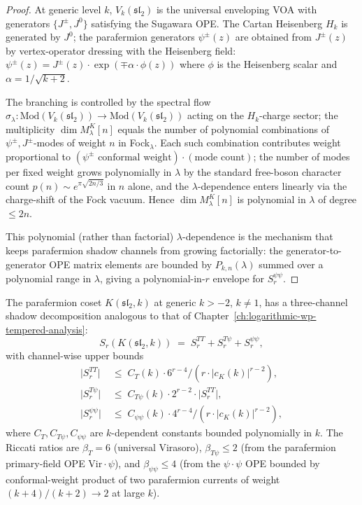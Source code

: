 \begin{proof}
At generic level $k$, $V_k(\mathfrak{sl}_2)$ is the universal
enveloping VOA with generators $\{J^\pm, J^0\}$ satisfying the
Sugawara OPE. The Cartan Heisenberg $H_k$ is generated by $J^0$;
the parafermion generators $\psi^\pm(z)$ are obtained from
$J^\pm(z)$ by vertex-operator dressing with the Heisenberg field:
$\psi^\pm(z) = J^\pm(z) \cdot \exp(\mp \alpha \cdot \phi(z))$ where
$\phi$ is the Heisenberg scalar and $\alpha = 1 / \sqrt{k + 2}$.

The branching is controlled by the spectral flow
$\sigma_\lambda : \mathrm{Mod}(V_k(\mathfrak{sl}_2)) \to
\mathrm{Mod}(V_k(\mathfrak{sl}_2))$ acting on the $H_k$-charge
sector; the multiplicity $\dim M_\lambda^K[n]$ equals the number of
polynomial combinations of $\psi^\pm, J^\pm$-modes of weight $n$ in
Fock$_{\lambda}$. Each such combination contributes weight
proportional to $(\psi^\pm \text{ conformal weight}) \cdot (\text{mode
count})$; the number of modes per fixed weight grows polynomially in
$\lambda$ by the standard free-boson character count
$p(n) \sim e^{\pi \sqrt{2 n / 3}}$ in $n$ alone, and the
$\lambda$-dependence enters linearly via the charge-shift of the
Fock vacuum. Hence $\dim M_\lambda^K[n]$ is polynomial in $\lambda$
of degree $\le 2 n$.

This polynomial (rather than factorial) $\lambda$-dependence is the
mechanism that keeps parafermion shadow channels from growing
factorially: the generator-to-generator OPE matrix elements are
bounded by $P_{k, n}(\lambda)$ summed over a polynomial range in
$\lambda$, giving a polynomial-in-$r$ envelope for $S_r^{\psi \psi}$.
\end{proof}

\begin{proposition}
\label{prop:parafermion-channel-decomposition}
\ClaimStatusProvedHere
The parafermion coset $K(\mathfrak{sl}_2, k)$ at generic $k > -2$,
$k \neq 1$, has a three-channel shadow decomposition analogous to
that of Chapter~\ref{ch:logarithmic-wp-tempered-analysis}:
\[
 S_r(K(\mathfrak{sl}_2, k))
 \;=\;
 S_r^{TT} + S_r^{T\psi} + S_r^{\psi\psi},
\]
with channel-wise upper bounds
\begin{align*}
 \lvert S_r^{TT} \rvert
 &\;\le\; C_T(k) \cdot 6^{r-4} / (r \cdot \lvert c_K(k) \rvert^{r-2}), \\
 \lvert S_r^{T\psi} \rvert
 &\;\le\; C_{T\psi}(k) \cdot 2^{r-2} \cdot \lvert S_r^{TT} \rvert, \\
 \lvert S_r^{\psi\psi} \rvert
 &\;\le\; C_{\psi\psi}(k) \cdot 4^{r-4} / (r \cdot \lvert c_K(k) \rvert^{r-2}),
\end{align*}
where $C_T, C_{T\psi}, C_{\psi\psi}$ are $k$-dependent constants
bounded polynomially in $k$. The Riccati ratios are
$\beta_T = 6$ (universal Virasoro), $\beta_{T\psi} \le 2$
(from the parafermion primary-field OPE
$\mathrm{Vir} \cdot \psi$), and $\beta_{\psi\psi} \le 4$ (from the
$\psi \cdot \psi$ OPE bounded by conformal-weight product of two
parafermion currents of weight $(k + 4)/(k + 2) \to 2$ at large
$k$).
\end{proposition}

